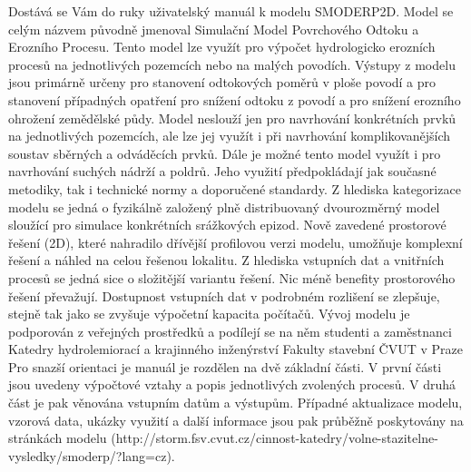 


Dostává se Vám do ruky uživatelský manuál k modelu SMODERP2D. Model se celým názvem původně jmenoval Simulační Model Povrchového Odtoku a Erozního Procesu. Tento model lze využít pro výpočet hydrologicko erozních procesů na jednotlivých pozemcích nebo na malých povodích. Výstupy z modelu jsou primárně určeny pro stanovení odtokových poměrů v ploše povodí a pro stanovení případných opatření pro snížení odtoku z povodí a pro snížení erozního ohrožení zemědělské půdy. Model neslouží jen pro navrhování konkrétních prvků na jednotlivých pozemcích, ale lze jej využít i při navrhování komplikovanějších soustav sběrných a odváděcích prvků. Dále je možné tento model využít i pro navrhování suchých nádrží a poldrů. Jeho využití předpokládají jak současné metodiky, tak i technické normy a doporučené standardy.
Z hlediska kategorizace modelu se jedná o fyzikálně založený plně distribuovaný dvourozměrný model sloužící pro simulace konkrétních srážkových epizod. Nově zavedené prostorové řešení (2D), které nahradilo dřívější profilovou verzi modelu, umožňuje komplexní řešení a náhled na celou řešenou lokalitu. Z hlediska vstupních dat a vnitřních procesů se jedná sice o složitější variantu řešení. Nic méně benefity prostorového řešení převažují. Dostupnost vstupních dat v podrobném rozlišení se zlepšuje, stejně tak jako se zvyšuje výpočetní kapacita počítačů.
Vývoj modelu je podporován z veřejných prostředků a podílejí se na něm studenti a zaměstnanci Katedry hydrolemiorací a krajinného inženýrství Fakulty stavební ČVUT v Praze
Pro snazší orientaci je manuál je rozdělen na dvě základní části. V první části jsou uvedeny výpočtové vztahy a popis jednotlivých zvolených procesů. V druhá část je pak věnována vstupním datům a výstupům.
Případné aktualizace modelu, vzorová data, ukázky využití a další informace jsou pak průběžně poskytovány na stránkách  modelu (http://storm.fsv.cvut.cz/cinnost-katedry/volne-stazitelne-vysledky/smoderp/?lang=cz).